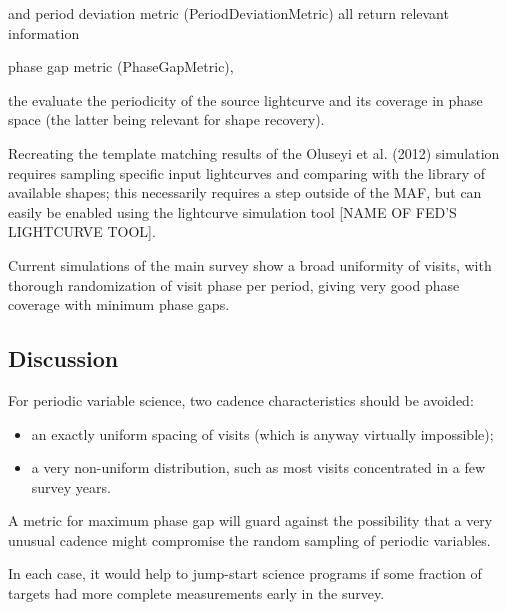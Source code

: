 and period deviation metric (PeriodDeviationMetric) all return relevant information 

phase gap metric (PhaseGapMetric),

the evaluate the periodicity of the source lightcurve and its coverage in phase space (the latter being relevant for shape recovery). 

Recreating the template matching results of the Oluseyi et al. (2012) simulation requires sampling specific input lightcurves and comparing with the library of available shapes; this necessarily requires a step outside of the MAF, but can easily be enabled using the lightcurve simulation tool [NAME OF FED'S LIGHTCURVE TOOL].
 



Current simulations of the main survey show a broad uniformity of visits, with thorough randomization of visit phase per period, giving very good phase coverage with minimum phase gaps.



\subsection{Discussion}
\label{sec:keyword:discussion}

For periodic variable science, two cadence characteristics should be avoided:
\begin{itemize}
\item an exactly uniform spacing of visits (which is anyway virtually impossible); \
\item a very non-uniform distribution, such as most visits concentrated in a few survey years.
 \end{itemize}

A metric for maximum phase gap will guard against the possibility that a very unusual cadence might compromise the random sampling of periodic variables.

In each case, it would help to jump-start science programs if some fraction of targets had more complete measurements early in the survey.



\navigationbar
